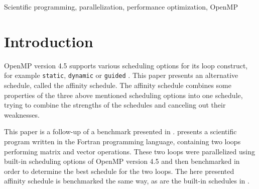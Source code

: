 \documentclass[twoside,11pt]{article}
\title{\titl}
\author{}
\begin{document}
\maketitle

\begin{abstract}
This paper describes an alternative schedule for scheduling
OpenMP's loop construct, the affinity schedule.
The affinity schedule tries to add positive properties of
different built-in schedules together into one schedule.
This paper is a follow-up on a benchmark presented in
\citet{b1}.

Two versions of the affinity schedule are presented and
compared against each other.
This paper describes in detail how the two versions of the
affinity schedule are implemented.
Afterwards they are benchmarked and compared against well
performing built-in schedules determined in \citet{b1}.

While the two versions of the affinity schedule perform
well for the most parts and sometimes even outperforming
the built-in schedules, this paper comes to the conclusion
that the affinity schedule simply is too complex and
contains too much synchronization, which hurts its
scalability.
An idea for a better performing affinity schedule is
presented.
\end{abstract}

\begin{keywords}
Scientific programming, parallelization,
performance optimization, OpenMP
\end{keywords}

\section{Introduction} %

OpenMP version 4.5 supports various scheduling options for
its loop construct, for example \texttt{static},
\texttt{dynamic} or \texttt{guided}
\citep[see][Chapter 2]{omp}.
This paper presents an alternative schedule, called the
affinity schedule.
The affinity schedule combines some properties of the three
above mentioned scheduling options into one schedule,
trying to combine the strengths of the schedules and
canceling out their weaknesses.

This paper is a follow-up of a benchmark presented in
\citet{b1}.
\citet{b1} presents a scientific program written in the
Fortran programming language, containing two loops
performing matrix and vector operations.
These two loops were parallelized using built-in scheduling
options of OpenMP version 4.5 and then benchmarked in order
to determine the best schedule for the two loops.
The here presented affinity schedule is benchmarked the
same way, as are the built-in schedules in \citet{b1}.
\end{document}

